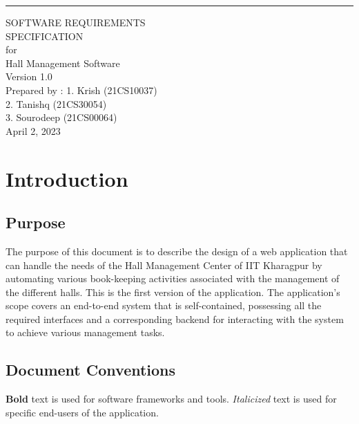 \documentclass{scrreprt}
\date{}
\def\myversion{1.0 }
\begin{document}
\begin{flushright}
    \rule{16cm}{5pt}\vskip1cm
    \begin{bfseries}
        \Huge{SOFTWARE REQUIREMENTS\\ SPECIFICATION}\\
        \vspace{1.5cm}
        for\\
        \vspace{1.5cm}
        Hall Management Software\\
        \vspace{1.5cm}
        \LARGE{Version \myversion}\\
        \vspace{1.5cm}
        Prepared by : 1. Krish (21CS10037)\\
        2. Tanishq (21CS30054)\\
        3. Sourodeep (21CS00064)\\
        \vspace{1.5cm}
        \vspace{1.5cm}
        April 2, 2023\\
    \end{bfseries}
\end{flushright}

\tableofcontents

\chapter{Introduction}

\section{Purpose}
The purpose of this document is to describe the design of a web application that can handle the needs of the Hall Management Center of IIT Kharagpur by automating various book-keeping activities associated with the management of the different halls.
This is the first version of the application.
The application's scope covers an end-to-end system that is self-contained, possessing all the required interfaces and a corresponding backend for interacting with the system to achieve various management tasks.

\section{Document Conventions}
\textbf{Bold} text is used for software frameworks and tools.
\textit{Italicized} text is used for specific end-users of the application.
\end{document}
